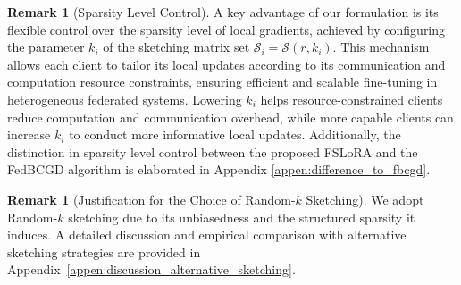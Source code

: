 \documentclass{article} %
\theoremstyle{plain}
\newtheorem{proposition}[theorem]{Proposition}
\theoremstyle{definition}
\newtheorem{remark}[theorem]{Remark}
\begin{document}


\begin{remark}[Sparsity Level Control]
A key advantage of our formulation is its flexible control over the sparsity level of local gradients, achieved by configuring the parameter \(k_i\) of the sketching matrix set \( \mathcal{S}_i = \mathcal{S}(r, k_i) \). This mechanism allows each client to tailor its local updates according to its communication and computation resource constraints, ensuring efficient and scalable fine-tuning in heterogeneous federated systems. Lowering \( k_i \) helps resource-constrained clients reduce computation and communication overhead, while more capable clients can increase \( k_i \) to conduct more informative local updates. Additionally, the distinction in sparsity level control between the proposed FSLoRA and the FedBCGD algorithm \citep{liu2024fedbcgd} is elaborated in Appendix \ref{appen:difference_to_fbcgd}.
\end{remark}

\begin{remark}[Justification for the Choice of Random-$k$ Sketching] We adopt Random-$k$ sketching due to its unbiasedness and the structured sparsity it induces.
A detailed discussion and empirical comparison with alternative sketching strategies are provided in Appendix~\ref{appen:discussion_alternative_sketching}.
\end{remark}

\end{document}
